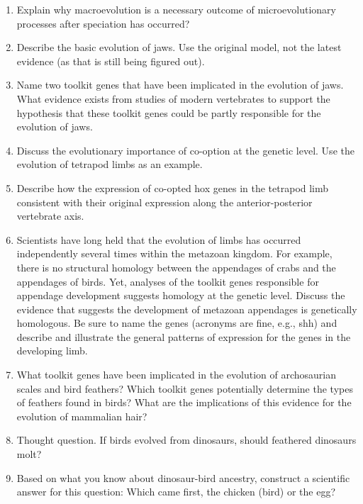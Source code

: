 \documentclass[letterpaper]{tufte-handout}
\begin{document}
\begin{enumerate}
	
	\item Explain why macroevolution is a necessary outcome of microevolutionary processes after speciation has occurred?
	
	\item Describe the basic evolution of jaws.  Use the original model, not the latest evidence (as that is still being figured out).

	\item Name two toolkit genes that have been implicated in the evolution of jaws.  What evidence exists from studies of modern vertebrates to support the hypothesis that these toolkit genes could be partly responsible for the evolution of jaws.

	\item Discuss the evolutionary importance of co-option at the genetic level.  Use the evolution of tetrapod limbs as an example. 

	\item Describe how the expression of co-opted hox genes in the tetrapod limb consistent with their original expression along the anterior-posterior vertebrate axis.

	\item Scientists have long held that the evolution of limbs has occurred independently several times within the metazoan kingdom.  For example, there is no structural homology between the appendages of crabs and the appendages of birds. Yet, analyses of the toolkit genes responsible for appendage development suggests homology at the genetic level.  Discuss the evidence that suggests the development of metazoan appendages is genetically homologous.  Be sure to name the genes (acronyms are fine, e.g., shh) and describe and illustrate the general patterns of expression for the genes in the developing limb.
	
	\item What toolkit genes have been implicated in the evolution of archosaurian scales and bird feathers?  Which toolkit genes potentially determine the types of feathers found in birds?  What are the implications of this evidence for the evolution of mammalian hair? 

	\item Thought question. If birds evolved from dinosaurs, should feathered dinosaurs molt?

	\item Based on what you know about dinosaur-bird ancestry, construct a scientific answer for this question: Which came first, the chicken (bird) or the egg?
	
\end{enumerate}
\end{document}
